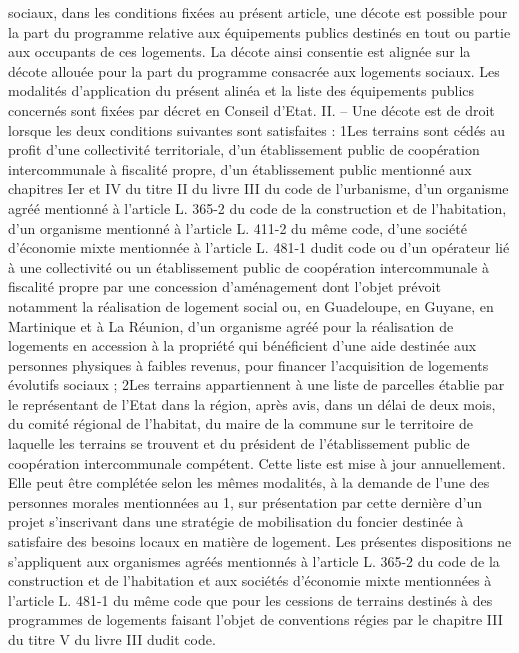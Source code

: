 \documentclass[11pt,a4paper]{report}
\begin{document}
	sociaux, dans les conditions fixées au présent article, une décote est possible pour la part du programme relative
	aux équipements publics destinés en tout ou partie aux occupants de ces logements. La décote ainsi consentie est
	alignée sur la décote allouée pour la part du programme consacrée aux logements sociaux. Les modalités
	d'application du présent alinéa et la liste des équipements publics concernés sont fixées par décret en Conseil
	d'Etat.
	II. – Une décote est de droit lorsque les deux conditions suivantes sont satisfaites :
	1\degre  Les terrains sont cédés au profit d'une collectivité territoriale, d'un établissement public de coopération
	intercommunale à fiscalité propre, d'un établissement public mentionné aux chapitres Ier et IV du titre II du
	livre III du code de l'urbanisme, d'un organisme agréé mentionné à l'article L. 365-2 du code de la construction
	et de l'habitation, d'un organisme mentionné à l'article L. 411-2 du même code, d'une société d'économie mixte
	mentionnée à l'article L. 481-1 dudit code ou d'un opérateur lié à une collectivité ou un établissement public de
	coopération intercommunale à fiscalité propre par une concession d'aménagement dont l'objet prévoit
	notamment la réalisation de logement social ou, en Guadeloupe, en Guyane, en Martinique et à La Réunion,
	d'un organisme agréé pour la réalisation de logements en accession à la propriété qui bénéficient d'une aide
	destinée aux personnes physiques à faibles revenus, pour financer l'acquisition de logements évolutifs sociaux ;
	2\degre  Les terrains appartiennent à une liste de parcelles établie par le représentant de l'Etat dans la région, après
	avis, dans un délai de deux mois, du comité régional de l'habitat, du maire de la commune sur le territoire de
	laquelle les terrains se trouvent et du président de l'établissement public de coopération intercommunale
	compétent. Cette liste est mise à jour annuellement. Elle peut être complétée selon les mêmes modalités, à la
	demande de l'une des personnes morales mentionnées au 1\degre , sur présentation par cette dernière d'un projet
	s'inscrivant dans une stratégie de mobilisation du foncier destinée à satisfaire des besoins locaux en matière de
	logement.
	Les présentes dispositions ne s'appliquent aux organismes agréés mentionnés à l'article L. 365-2 du code de la
	construction et de l'habitation et aux sociétés d'économie mixte mentionnées à l'article L. 481-1 du même code
	que pour les cessions de terrains destinés à des programmes de logements faisant l'objet de conventions régies
	par le chapitre III du titre V du livre III dudit code.
\end{document}
